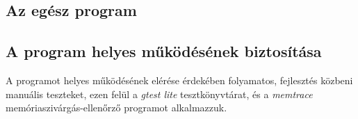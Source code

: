 \begin{center}
\end{center}

\subsection{Az egész program}
\begin{center}
\end{center}

\subsection{A program helyes működésének biztosítása}
A programot helyes működésének elérése érdekében folyamatos, fejlesztés közbeni
manuális teszteket, ezen felül a \textit{gtest lite} tesztkönyvtárat,
és a \textit{memtrace} memóriaszivárgás-ellenőrző programot alkalmazzuk.
